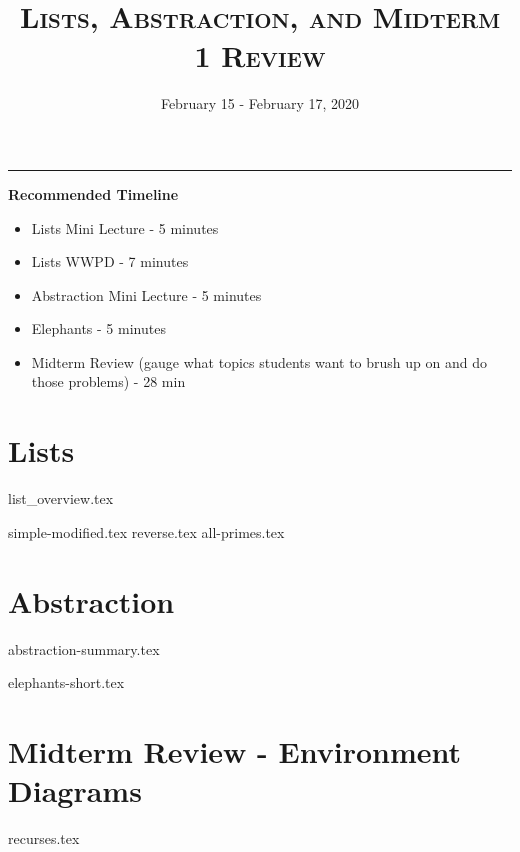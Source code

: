 \documentclass{exam}
\title{\textsc{Lists, Abstraction, and Midterm 1 Review}}
\date{February 15 - February 17, 2020}
\begin{document}
\maketitle
\rule{\textwidth}{0.15em}
\fontsize{12}{15}\selectfont


\begin{guide}
    \textbf{Recommended Timeline}
    \begin{itemize}
        \item Lists Mini Lecture - 5 minutes
        \item Lists WWPD - 7 minutes
        \item Abstraction Mini Lecture - 5 minutes
        \item Elephants - 5 minutes
        \item Midterm Review (gauge what topics students want to brush up on and do those problems) - 28 min
    \end{itemize}
\end{guide}

\section{Lists}
{list_overview.tex}
\begin{questions}
{simple-modified.tex}
{reverse.tex}
{all-primes.tex}
\end{questions}

\newpage
\section{Abstraction}
{abstraction-summary.tex}
\begin{questions}
{elephants-short.tex}
\end{questions}

\newpage
\section{Midterm Review - Environment Diagrams}
\begin{questions}
{recurses.tex}
\end{questions}
\end{document}
